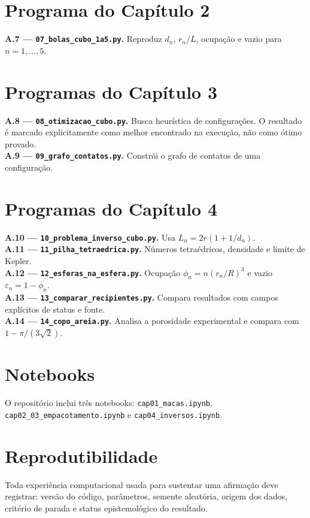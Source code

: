\section{Programa do Capítulo 2}
\textbf{A.7 — \texttt{07\_bolas\_cubo\_1a5.py}.} Reproduz $d_n$, $r_n/L$, ocupação e vazio para $n=1,\ldots,5$.

\section{Programas do Capítulo 3}
\textbf{A.8 — \texttt{08\_otimizacao\_cubo.py}.} Busca heurística de configurações. O resultado é marcado explicitamente como melhor encontrado na execução, não como ótimo provado.\\
\textbf{A.9 — \texttt{09\_grafo\_contatos.py}.} Constrói o grafo de contatos de uma configuração.

\section{Programas do Capítulo 4}
\textbf{A.10 — \texttt{10\_problema\_inverso\_cubo.py}.} Usa $L_n=2r(1+1/d_n)$.\\
\textbf{A.11 — \texttt{11\_pilha\_tetraedrica.py}.} Números tetraédricos, densidade e limite de Kepler.\\
\textbf{A.12 — \texttt{12\_esferas\_na\_esfera.py}.} Ocupação $\phi_n=n(r_n/R)^3$ e vazio $\varepsilon_n=1-\phi_n$.\\
\textbf{A.13 — \texttt{13\_comparar\_recipientes.py}.} Compara resultados com campos explícitos de status e fonte.\\
\textbf{A.14 — \texttt{14\_copo\_areia.py}.} Analisa a porosidade experimental e compara com $1-\pi/(3\sqrt2)$.

\section{Notebooks}
O repositório inclui três notebooks: \texttt{cap01\_macas.ipynb}, \texttt{cap02\_03\_empacotamento.ipynb} e \texttt{cap04\_inversos.ipynb}.

\section{Reprodutibilidade}
Toda experiência computacional usada para sustentar uma afirmação deve registrar: versão do código, parâmetros, semente aleatória, origem dos dados, critério de parada e status epistemológico do resultado.

